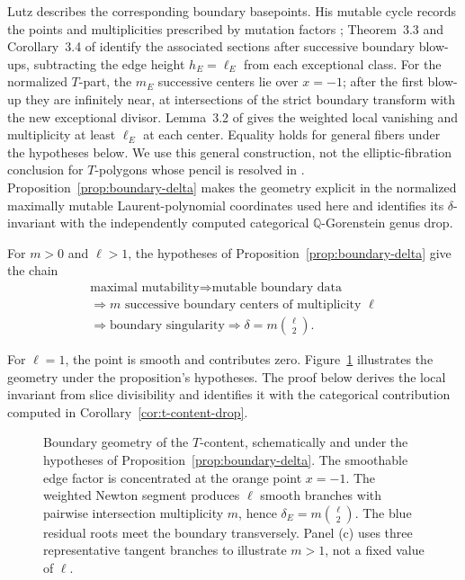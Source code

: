 \documentclass[11pt]{article}
\theoremstyle{plain}
\theoremstyle{definition}
\theoremstyle{remark}
\newcommand{\Q}{\mathbb Q}
\newcommand{\1}{\mathbf 1}
\begin{document}
Lutz describes the corresponding boundary basepoints.  His mutable cycle records the points and multiplicities prescribed by mutation factors \cite[Definition 3.1]{Lutz}; Theorem~3.3 and Corollary~3.4 of \cite{Lutz} identify the associated sections after successive boundary blow-ups, subtracting the edge height $h_E=\ell_E$ from each exceptional class.  For the normalized $T$-part, the $m_E$ successive centers lie over $x=-1$; after the first blow-up they are infinitely near, at intersections of the strict boundary transform with the new exceptional divisor.  Lemma~3.2 of \cite{Lutz} gives the weighted local vanishing and multiplicity at least $\ell_E$ at each center.  Equality holds for general fibers under the hypotheses below.  We use this general construction, not the elliptic-fibration conclusion for $T$-polygons whose pencil is resolved in \cite[Lemma 3.6]{Lutz}.  Proposition~\ref{prop:boundary-delta} makes the geometry explicit in the normalized maximally mutable Laurent-polynomial coordinates used here and identifies its $\delta$-invariant with the independently computed categorical $\Q$-Gorenstein genus drop.

\begin{samepage}
For $m>0$ and $\ell>1$, the hypotheses of Proposition~\ref{prop:boundary-delta} give the chain
\[
\boxed{\begin{gathered}
\text{maximal mutability}\Longrightarrow\text{mutable boundary data}\\
\Longrightarrow\text{$m$ successive boundary centers of multiplicity $\ell$}\\
\Longrightarrow\text{boundary singularity}\Longrightarrow\delta=m\binom{\ell}{2}.
\end{gathered}}
\]
\end{samepage}
For $\ell=1$, the point is smooth and contributes zero.  Figure~\ref{fig:boundary-delta} illustrates the geometry under the proposition's hypotheses.  The proof below derives the local invariant from slice divisibility and identifies it with the categorical contribution computed in Corollary~\ref{cor:t-content-drop}.

\begin{figure}[!htbp]
\centering

\caption{Boundary geometry of the $T$-content, schematically and under the hypotheses of Proposition~\ref{prop:boundary-delta}.  The smoothable edge factor is concentrated at the orange point $x=-1$.  The weighted Newton segment produces $\ell$ smooth branches with pairwise intersection multiplicity $m$, hence $\delta_E=m\binom{\ell}{2}$.  The blue residual roots meet the boundary transversely.  Panel (c) uses three representative tangent branches to illustrate $m>1$, not a fixed value of $\ell$.}
\label{fig:boundary-delta}
\end{figure}
\end{document}
